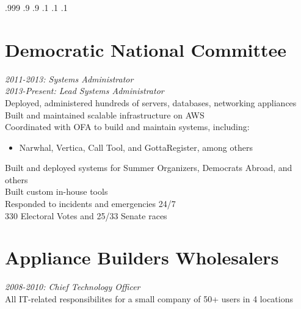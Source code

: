 \documentclass[9pt]{res} %
\begin{document}

\moveleft.999\hoffset{}  
\moveleft.9\hoffset{}
\moveleft.9\hoffset{}
\vspace{-14mm}
\moveright.1\hoffset{}
\moveright.1\hoffset{}
\moveright.1\hoffset{}
\begin{resume}

\section{Democratic National Committee} 

{\sl 2011-2013: Systems Administrator} \\
{\sl 2013-Present: Lead Systems Administrator} \\
Deployed, administered hundreds of servers, databases, networking appliances \\
Built and maintained scalable infrastructure on AWS \\
Coordinated with OFA to build and maintain systems, including:
\begin{itemize} \item Narwhal, Vertica, Call Tool, and GottaRegister, among others \end{itemize}
\vspace{-4mm}
Built and deployed systems for Summer Organizers, Democrats Abroad, and others \\
Built custom in-house tools \\
Responded to incidents and emergencies 24/7 \\ 
330 Electoral Votes and 25/33 Senate races


\vspace{-2mm}
\section{Appliance Builders Wholesalers} 

{\sl 2008-2010: Chief Technology Officer} \\ 
All IT-related responsibilites for a small company of 50+ users in 4 locations


\end{resume}
\end{document}
